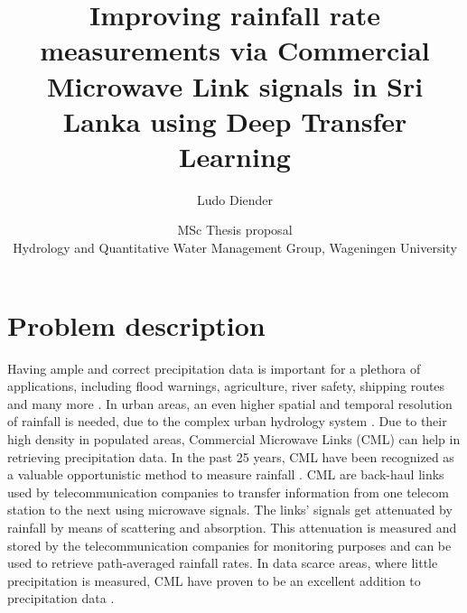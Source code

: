\documentclass[twocolumn, 10pt, a4paper]{article}
\begin{document}
	\title{\vspace{-1cm}\Huge{Improving rainfall rate measurements via Commercial Microwave Link signals in Sri Lanka using Deep Transfer Learning}}
	\author{\Large{Ludo Diender}}
	\date{\normalsize{MSc Thesis proposal\\
			Hydrology and Quantitative Water Management Group,
			Wageningen University}}
	
	\maketitle
	
	\section{Problem description}
	
	Having ample and correct precipitation data is important for a plethora of applications, including flood warnings, agriculture, river safety, shipping routes and many more \cite{Chwala2019}. In urban areas, an even higher spatial and temporal resolution of rainfall is needed, due to the complex urban hydrology system \cite{Overeem2011}. Due to their high density in populated areas, Commercial Microwave Links (CML) can help in retrieving precipitation data. In the past 25 years, CML have been recognized as a valuable opportunistic method to measure rainfall \cite{Leijnse2007} \cite{Ruf1996}. CML are back-haul links used by telecommunication companies to transfer information from one telecom station to the next using microwave signals. The links' signals get attenuated by rainfall by means of scattering and absorption. This attenuation is measured and stored by the telecommunication companies for monitoring purposes and can be used to retrieve path-averaged rainfall rates. In data scarce areas, where little precipitation is measured, CML have proven to be an excellent addition to precipitation data \cite{Overeem2021,Doumounia2014,Diba2021}.   
	
\end{document}
